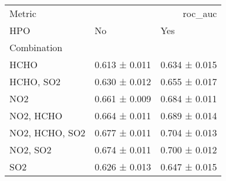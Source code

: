 \begin{tabular}{lll}
\toprule
Metric & \multicolumn{2}{r}{roc_auc} \\
HPO & No & Yes \\
Combination &  &  \\
\midrule
HCHO & 0.613 ± 0.011 & 0.634 ± 0.015 \\
HCHO, SO2 & 0.630 ± 0.012 & 0.655 ± 0.017 \\
NO2 & 0.661 ± 0.009 & 0.684 ± 0.011 \\
NO2, HCHO & 0.664 ± 0.011 & 0.689 ± 0.014 \\
NO2, HCHO, SO2 & 0.677 ± 0.011 & 0.704 ± 0.013 \\
NO2, SO2 & 0.674 ± 0.011 & 0.700 ± 0.012 \\
SO2 & 0.626 ± 0.013 & 0.647 ± 0.015 \\
\bottomrule
\end{tabular}
